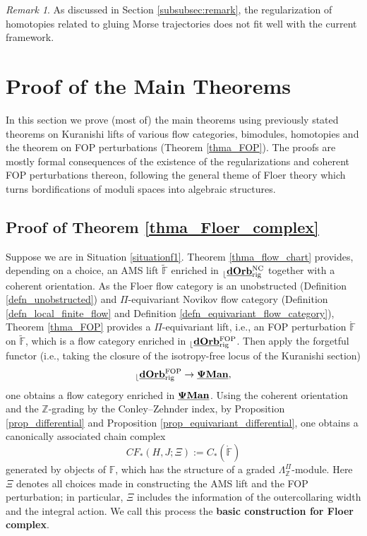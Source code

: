 \documentclass[reqno, 10pt]{amsart}
\numberwithin{equation}{section}
\numberwithin{equation}{section}
\theoremstyle{definition}
\theoremstyle{remark}
\newtheorem{rem}[thm]{Remark}
\newcommand{\beqn}{\begin{equation*}}
\newcommand{\eeqn}{\end{equation*}}
\newcommand{\mb}{\mathbb}
\renewcommand{\outer}{{}_{\lfloor}}
\newcommand{\pman}{\uds{{\bf \Psi}{\bf Man}}}
\newcommand{\uds}[1]{\underline{\smash{#1}}}
\begin{document}
\begin{rem}
As discussed in Section \ref{subsubsec:remark}, the regularization of homotopies related to gluing Morse trajectories does not fit well with the current framework.
\end{rem}


\section{Proof of the Main Theorems}

In this section we prove (most of) the main theorems using previously stated theorems on Kuranishi lifts of various flow categories, bimodules, homotopies and the theorem on FOP perturbations (Theorem \ref{thma_FOP}). The proofs are mostly formal consequences of the existence of the regularizations and coherent FOP perturbations thereon, following the general theme of Floer theory which turns bordifications of moduli spaces into algebraic structures.




\subsection{Proof of Theorem \ref{thma_Floer_complex}}

Suppose we are in Situation \ref{situationf1}. Theorem \ref{thma_flow_chart} provides, depending on a choice, an AMS lift $\tilde {\mb F}$ enriched in $\outer \uds{\bf dOrb}^{{\rm NC}}_{\rm rig}$ together with a coherent orientation. As the Floer flow category is an unobstructed (Definition \ref{defn_unobstructed}) and $\Pi$-equivariant Novikov flow category  (Definition \ref{defn_local_finite_flow} and Definition \ref{defn_equivariant_flow_category}), Theorem \ref{thma_FOP} provides a $\Pi$-equivariant lift, i.e., an FOP perturbation $\mathring {\mb F}$ on $\tilde {\mb F}$, which is a flow category enriched in $\outer \uds{\bf dOrb}^{\rm FOP}_{\rm rig}$. Then apply the forgetful functor (i.e., taking the closure of the isotropy-free locus of the Kuranishi section)
\beqn
\outer \uds{\bf dOrb}^{\rm FOP}_{\rm rig} \to \pman,
\eeqn
one obtains a flow category enriched in $\pman$. Using the coherent orientation and the  ${\mb Z}$-grading by the Conley--Zehnder index, by Proposition \ref{prop_differential} and Proposition \ref{prop_equivariant_differential}, one obtains a canonically associated chain complex
\beqn
CF_*(H, J; \Xi):= C_*( \mathring {\mb F} )
\eeqn
generated by objects of $\mb{F}$, which has the structure of a graded $\Lambda_{\mb Z}^\Pi$-module. Here $\Xi$ denotes all choices made in constructing the AMS lift and the FOP perturbation; in particular, $\Xi$ includes the information of the outercollaring width and the integral action. We call this process the {\bf basic construction for Floer complex}.
\end{document}
